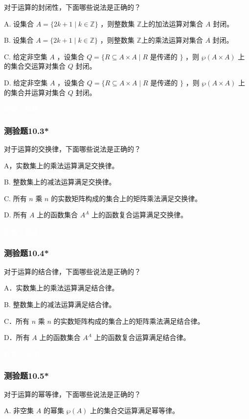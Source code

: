 \documentclass[UTF8, heading=true]{ctexart}
\begin{document}
对于运算的封闭性，下面哪些说法是正确的？

A. 设集合 $A=\{2 k+1 \mid k \in \mathbb{Z}\}$ ，则整数集 $\mathbb{Z} $上的加法运算对集合 $A$ 封闭。

B. 设集合 $A=\{2 k+1 \mid k \in \mathbb{Z}\}$ ，则整数集 $\mathbb{Z} $上的乘法运算对集合 $A$ 封闭。

C. 给定非空集 $A$ ，设集合 $Q=\{R \subseteq A \times A \mid R$ 是传递的 $\}$ ，则 $\wp(A \times A)$ 上的集合交运算对集合 $Q$ 封闭。

D. 给定非空集 $A$ ，设集合 $Q=\{R \subseteq A \times A \mid R$ 是传递的 $\}$ ，则 $\wp(A \times A)$ 上的集合并运算对集合 $Q$ 封闭。


\textcolor{white}{答案：暂缺}

\subsubsection{测验题10.3*}

对于运算的交换律，下面哪些说法是正确的？

A，实数集上的乘法运算满足交换律。

B. 整数集上的减法运算满足交换律。

C. 所有 $n$ 乘 $n$ 的实数矩阵构成的集合上的矩阵乘法满足交换律。

D. 所有 $A$ 上的函数集合 $A^A$ 上的函数复合运算满足交换律。

\textcolor{white}{答案：暂缺}

\subsubsection{测验题10.4*}

对于运算的结合律，下面哪些说法是正确的？

A．实数集上的乘法运算满足结合律。

B. 整数集上的减法运算满足结合律。

C．所有 $n$ 乘 $n$ 的实数矩阵构成的集合上的矩阵乘法满足结合律。

D．所有 $A$ 上的函数集合 $A^A$ 上的函数复合运算满足结合律。

\textcolor{white}{答案：ACD}

\subsubsection{测验题10.5*}

对于运算的幂等律，下面哪些说法是正确的？

A. 非空集 $A$ 的幂集 $\wp(A)$ 上的集合交运算满足幂等律。
\end{document}
